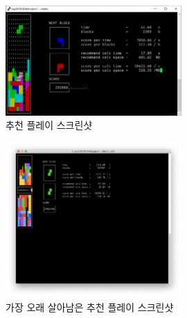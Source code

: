 \begin{figure}
    \centering
        \includegraphics[width=0.6\textwidth]{inc-images/screenshot4}
    \caption{추천 플레이 스크린샷}
    \label{fig:recommend-play}
\end{figure}

\begin{figure}
    \centering
        \includegraphics[width=0.6\textwidth]{inc-images/screenshot-best}
    \caption{가장 오래 살아남은 추천 플레이 스크린샷}
    \label{fig:best-play}
\end{figure}

\newpage